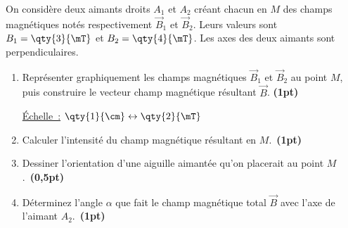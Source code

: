 \begin{minipage}[t][][t]{0.58\linewidth}
    On considère deux aimants droits $A_1$ et $A_2$ créant chacun en $M$ des
    champs magnétiques notés respectivement $\vec{B}_1$ et $\vec{B}_2$. Leurs
    valeurs sont $B_1=\qty{3}{\mT}$ et $B_2=\qty{4}{\mT}$. Les
    axes des deux aimants sont perpendiculaires.
    \begin{enumerate}
        \item Représenter graphiquement les champs magnétiques $\vec{B}_1$ et
              $\vec{B}_2$ au point $M$, puis construire le vecteur champ
              magnétique résultant $\vec{B}$. \textbf{(1pt)}

              \underline{Échelle~:} $\qty{1}{\cm}\leftrightarrow\qty{2}{\mT}$
    \end{enumerate}
\end{minipage}
\hfill
\begin{minipage}[t][][t]{0.40\linewidth}
    \vspace{-5mm}
    \begin{figure}[H]
    \flushleft
    \end{figure}
\end{minipage}

\vspace{-2mm}
\begin{enumerate}
    \setcounter{enumi}{1}
    \item Calculer l'intensité du champ magnétique résultant en
          $M$.~\textbf{(1pt)}
    \item Dessiner l'orientation d'une aiguille aimantée qu'on placerait au
          point $M$.~\textbf{(0,5pt)}
    \item Déterminez l'angle $\alpha$ que fait le champ magnétique total
          $\vec{B}$ avec l'axe de l'aimant $A_{2}$.~\textbf{(1pt)}
\end{enumerate}

